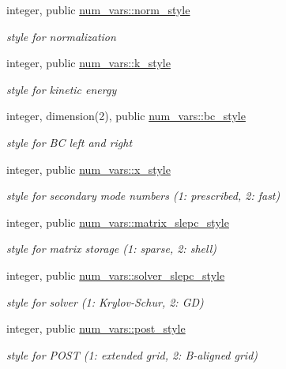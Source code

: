 \begin{DoxyCompactItemize}
integer, public \hyperlink{namespacenum__vars_acefc971404bce11e23308d5214d96d32}{num\+\_\+vars\+::norm\+\_\+style}
\begin{DoxyCompactList}\small\item\em style for normalization \end{DoxyCompactList}\item 
integer, public \hyperlink{namespacenum__vars_ac53a1bb8d91f2b753690456a340cfd44}{num\+\_\+vars\+::k\+\_\+style}
\begin{DoxyCompactList}\small\item\em style for kinetic energy \end{DoxyCompactList}\item 
integer, dimension(2), public \hyperlink{namespacenum__vars_aabda06d22d0bad62383df3a0d977a82c}{num\+\_\+vars\+::bc\+\_\+style}
\begin{DoxyCompactList}\small\item\em style for BC left and right \end{DoxyCompactList}\item 
integer, public \hyperlink{namespacenum__vars_ad847b8c0cbf1e841c788bd657b40af5f}{num\+\_\+vars\+::x\+\_\+style}
\begin{DoxyCompactList}\small\item\em style for secondary mode numbers (1\+: prescribed, 2\+: fast) \end{DoxyCompactList}\item 
integer, public \hyperlink{namespacenum__vars_addd869f9551067812954f8e24fe078b1}{num\+\_\+vars\+::matrix\+\_\+slepc\+\_\+style}
\begin{DoxyCompactList}\small\item\em style for matrix storage (1\+: sparse, 2\+: shell) \end{DoxyCompactList}\item 
integer, public \hyperlink{namespacenum__vars_aff32519d88708f2f44f80d62cfb0e0f4}{num\+\_\+vars\+::solver\+\_\+slepc\+\_\+style}
\begin{DoxyCompactList}\small\item\em style for solver (1\+: Krylov-\/\+Schur, 2\+: GD) \end{DoxyCompactList}\item 
integer, public \hyperlink{namespacenum__vars_a08dbb9f56d96f37c61cacb9d23d6e17f}{num\+\_\+vars\+::post\+\_\+style}
\begin{DoxyCompactList}\small\item\em style for P\+O\+ST (1\+: extended grid, 2\+: B-\/aligned grid) \end{DoxyCompactList}\item 

\end{DoxyCompactItemize}
